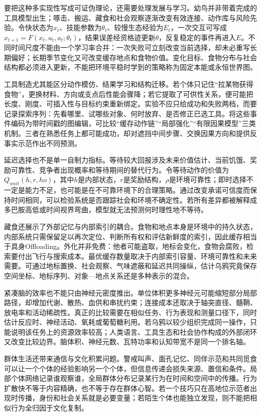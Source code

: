 要把这种多实现性写成可证伪理论，还需要处理发展与学习。幼鸟并非带着完成的工具模型出生；啄击、搬运、藏食和社会观察逐渐改变有效连接、动作库与风险先验。令快状态为$x_t$、技能参数为$\theta_t$、较慢生态经验为$E_t$，一次交互可写成$x_{t+1}=F(x_t,u_t,a_t;\theta_t)$，结果误差经资格迹更新$\theta$，反复稳定的事件再进入$E$。不同时间尺度不能由一个学习率合并：一次失败可立刻改变当前选择，却未必重写长期偏好；长期季节变化又可改变缓存地点和食物价值。变化目标、食物分布与社会结构都必须进入更新，不能把环境平稳时学到的策略称为固定本能或永恒世界图。

工具制造尤其能区分动作模仿、结果学习和结构迁移。若个体只记住“拉某物获得食物”，更换材料、方向或支点后性能会骤降；若它提取了可供性关系，便可能把长度、刚度、可插入性与目标约束重新绑定。实验不应只给成功和失败两档，而要记录探索序列：先看哪里、试哪些对象、何时放弃、是否修正已选工具。将这些事件编码为带时间戳的图编辑，可比较“缓存动作链”“局部强化”“有限因果模型”三类机制。三者在熟悉任务上都可能成功，却对遮挡中间步骤、交换因果方向和提供反事实示范作出不同预测。

延迟选择也不是单一自制力指标。等待较大回报涉及未来价值估计、当前饥饿、奖励可靠性、竞争者出现概率和等待期间的替代行为。令等待动作的价值为$Q_{wait}(h,r,
ho)$，其中$h$是内部状态，$r$是奖励结构，$\rho$是环境可靠性；即时选择不一定是能力不足，也可能是在不可靠环境下的合理策略。通过改变承诺可信度而保持时间相同，可以检验系统是否跟踪社会和环境不确定性。若所有差异都被解释成多巴胺高低或时间视界弯曲，模型就无法预测何时理性地不等待。

藏食还展示了外部记忆与内部索引的耦合。食物和地点本身是环境中的持久状态，内部系统只需保留足以再次定位、判断所有权和评估新鲜度的索引，因此缓存相当于具身Offloading。外化并非免费：他者可能盗取，地标会变化，食物会腐败，检索要付出飞行与搜索成本。最优缓存数量取决于内部索引容量、环境可靠性和未来需要。可通过地标置换、社会观察、气味遮蔽和延迟共同操纵，估计乌鸦究竟保存空间坐标、地标序列、对象—地点关系还是多种表示的混合。

紧凑脑的效率也不能只由神经元密度推出。单位体积更多神经元可能缩短部分局部路径，却增加代谢、散热、血供和串扰约束；连接成本还取决于轴突直径、髓鞘、放电率和活动稀疏性。真正的比较需要在相似任务、行为表现和测量口径下，同时估计反应时、神经活动、氧耗或葡萄糖利用。若乌鸦以较少组织完成同一操作，只能说明该任务上的资源效率较高；人类语言、工具生态和社会协作构成的外部闭环又改变比较边界。脑体积、神经元数、瓦特功率和认知带宽不是同一个排名轴。

群体生活还带来通信与文化积累问题。警戒叫声、面孔记忆、同伴示范和共同觅食可以让一个个体的经验影响另一个个体，但信息传递会损失来源、置信和条件。局部个体网络记录谁观察谁，全局群体分布记录某行为在时间和空间中的传播。行为扩散快不等于内容精确，也不等于存在群体心智。若一个技巧只在高地位示范者出现时传播，身份和社会关系就是必要变量；若陌生个体也能独立发现，则不能把相似行为全归因于文化复制。

